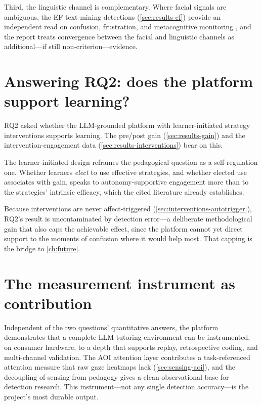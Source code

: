 Third, the linguistic channel is complementary. Where facial signals are
ambiguous, the EF text-mining detections (\cref{sec:results-ef}) provide
an independent read on confusion, frustration, and metacognitive
monitoring \citep{winne1998}, and the report treats convergence between
the facial and linguistic channels as additional---if still
non-criterion---evidence.

\section{Answering RQ2: does the platform support learning?}
\label{sec:discussion-rq2}

RQ2 asked whether the LLM-grounded platform with learner-initiated
strategy interventions supports learning. The pre/post gain
(\cref{sec:results-gain}) and the intervention-engagement data
(\cref{sec:results-interventions}) bear on this. 

The learner-initiated design reframes the pedagogical question as a
self-regulation one. Whether learners \emph{elect} to use effective
strategies, and whether elected use associates with gain, speaks to
autonomy-supportive engagement \citep{ryan2000} more than to the
strategies' intrinsic efficacy, which the cited literature already
establishes. 

Because interventions are never affect-triggered
(\cref{sec:interventions-autotrigger}), RQ2's result is uncontaminated by
detection error---a deliberate methodological gain that also caps the
achievable effect, since the platform cannot yet direct support to the
moments of confusion where it would help most. That capping is the bridge
to \cref{ch:future}.

\section{The measurement instrument as contribution}
\label{sec:discussion-instrument}

Independent of the two questions' quantitative answers, the platform
demonstrates that a complete LLM tutoring environment can be instrumented,
on consumer hardware, to a depth that supports replay, retrospective
coding, and multi-channel validation. The AOI attention layer contributes
a task-referenced attention measure that raw gaze heatmaps lack
(\cref{sec:sensing-aoi}), and the decoupling of sensing from pedagogy
gives a clean observational base for detection research. This
instrument---not any single detection accuracy---is the project's most
durable output.

